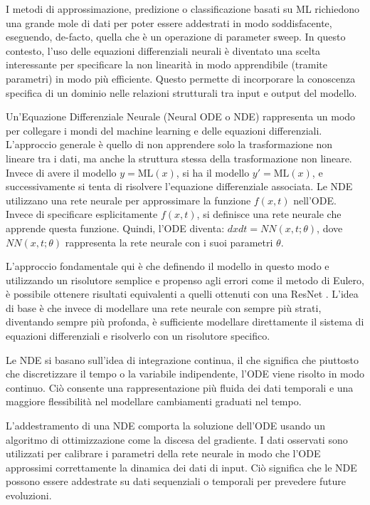 I metodi di approssimazione, predizione o classificazione basati su ML richiedono una grande mole di dati per poter essere addestrati in modo soddisfacente, eseguendo, de-facto, quella che è un operazione di parameter sweep. In questo contesto, l'uso delle equazioni differenziali neurali è diventato 
una scelta interessante per specificare la non linearità in modo 
apprendibile (tramite parametri) in modo più efficiente. Questo permette 
di incorporare la conoscenza specifica di un dominio nelle relazioni 
strutturali tra input e output del modello.

Un'Equazione Differenziale Neurale (Neural ODE o NDE) rappresenta un modo per 
collegare i mondi del machine learning e delle equazioni differenziali. 
L'approccio generale è quello di non apprendere solo la trasformazione 
non lineare tra i dati, ma anche la struttura stessa della 
trasformazione non lineare. Invece di avere il modello $y = \mathrm{ML}(x)$, 
si ha il modello $y' = \mathrm{ML}(x)$, e successivamente si tenta di risolvere 
l'equazione differenziale associata. Le NDE utilizzano una rete neurale per approssimare la funzione $f(x,t)$ nell'ODE. Invece di specificare esplicitamente $f(x,t)$, si definisce una rete neurale che apprende questa funzione. Quindi, l'ODE diventa: $dxdt=NN(x,t;\theta)$, dove $NN(x,t;\theta)$ rappresenta la rete neurale con i suoi parametri $\theta$.

L'approccio fondamentale qui è che definendo il modello in questo modo e 
utilizzando un risolutore semplice e propenso agli errori come il metodo 
di Eulero, è possibile ottenere risultati equivalenti a quelli ottenuti 
con una ResNet \cite{7780459}. L'idea di base è che invece di 
modellare una rete neurale con sempre più strati, diventando sempre 
più profonda, è sufficiente modellare direttamente il sistema di 
equazioni differenziali e risolverlo con un risolutore specifico.

Le NDE si basano sull'idea di integrazione continua, il che significa che piuttosto che discretizzare il tempo o la variabile indipendente, l'ODE viene risolto in modo continuo. Ciò consente una rappresentazione più fluida dei dati temporali e una maggiore flessibilità nel modellare cambiamenti graduati nel tempo.

L'addestramento di una NDE comporta la soluzione dell'ODE usando un algoritmo di ottimizzazione come la discesa del gradiente. I dati osservati sono utilizzati per calibrare i parametri della rete neurale in modo che l'ODE approssimi correttamente la dinamica dei dati di input. Ciò significa che le NDE possono essere addestrate su dati sequenziali o temporali per prevedere future evoluzioni.


